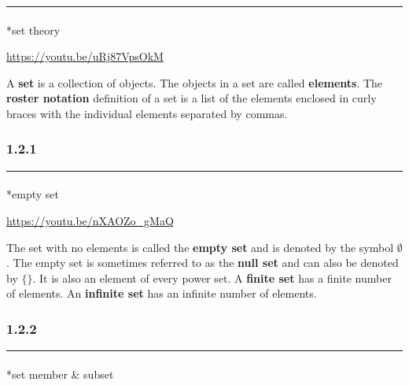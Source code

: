 \documentclass[
  letterpaper,
  DIV=11,
  numbers=noendperiod]{scrreprt}
\makeatletter
\let\oldparagraph\paragraph
\renewcommand{\paragraph}{
    \@ifstar
      \xxxParagraphStar
      \xxxParagraphNoStar
  }
\newcommand{\xxxParagraphStar}[1]{\oldparagraph*{#1}\mbox{}}
\newcommand{\xxxParagraphNoStar}[1]{\oldparagraph{#1}\mbox{}}
\makeatother
\begin{document}
\begin{center}\rule{0.5\linewidth}{0.5pt}\end{center}

\paragraph*{set theory}\label{set-theory}

\url{https://youtu.be/uRj87VpsOkM}

A {\textbf{set}} is a collection of objects. The objects in a set are
called {\textbf{elements}}. The {\textbf{roster notation}} definition of
a set is a list of the elements enclosed in curly braces with the
individual elements separated by commas.

\subsubsection*{1.2.1}\label{section-2}

\begin{center}\rule{0.5\linewidth}{0.5pt}\end{center}

\paragraph*{empty set}\label{empty-set}

\url{https://youtu.be/nXAOZo_gMaQ}

The set with no elements is called the {\textbf{empty set}} and is
denoted by the symbol \(∅\). The empty set is sometimes referred to as
the {\textbf{null set}} and can also be denoted by \(\{ \}\). {It is
also an element of every power set.} A {\textbf{finite set}} has a
finite number of elements. An {\textbf{infinite set}} has an infinite
number of elements.

\subsubsection*{1.2.2}\label{section-3}

\begin{center}\rule{0.5\linewidth}{0.5pt}\end{center}

\paragraph*{set member \& subset}\label{set-member-subset}
\end{document}
